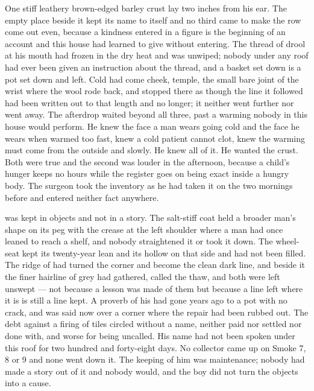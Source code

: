One stiff leathery brown-edged barley crust lay two inches from his ear. The empty place beside it kept its name to itself and no third came to make the row come out even, because a kindness entered in a figure is the beginning of an account and this house had learned to give without entering. The thread of drool at his mouth had frozen in the dry heat and was unwiped; nobody under any roof had ever been given an instruction about the thread, and a basket set down is a pot set down and left. Cold had come cheek, temple, the small bare joint of the wrist where the wool rode back, and stopped there as though the line it followed had been written out to that length and no longer; it neither went further nor went away. The afterdrop waited beyond all three, past a warming nobody in this house would perform. He knew the face a man wears going cold and the face he wears when warmed too fast, knew a cold patient cannot clot, knew the warming must come from the outside and slowly. He knew all of it. He wanted the crust. Both were true and the second was louder in the afternoon, because a child's hunger keeps no hours while the register goes on being exact inside a hungry body. The surgeon took the inventory as he had taken it on the two mornings before and entered neither fact anywhere.

\scenebreak

 was kept in objects and not in a story. The salt-stiff coat held a broader man's shape on its peg with the crease at the left shoulder where a man had once leaned to reach a shelf, and nobody straightened it or took it down. The wheel-seat kept its twenty-year lean and its hollow on that side and had not been filled. The ridge of  had turned the corner and become the clean dark line, and beside it the finer hairline of grey had gathered, called the thaw, and both were left unswept --- not because a lesson was made of them but because a line left where it is is still a line kept. A proverb of his had gone years ago to a pot with no crack, and was said now over a corner where the repair had been rubbed out. The debt against a firing of tiles circled without a name, neither paid nor settled nor done with, and worse for being uncalled. His name had not been spoken under this roof for two hundred and forty-eight days. No collector came up  on Smoke 7, 8 or 9 and none went down it. The keeping of him was maintenance; nobody had made a story out of it and nobody would, and the boy did not turn the objects into a cause.

